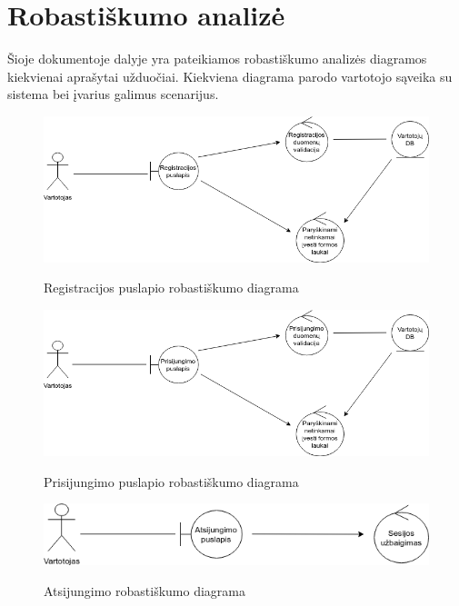 \documentclass{VUMIFPSkursinis}
\begin{document}
	\newpage

	\section{Robastiškumo analizė}
	Šioje dokumentoje dalyje yra pateikiamos robastiškumo analizės diagramos kiekvienai aprašytai užduočiai. Kiekviena diagrama parodo vartotojo sąveika su sistema  bei įvarius galimus scenarijus.

		\begin{figure}[H]
		\centering
		\includegraphics[width=\linewidth]{img/registracija.png}
		\label{fig:registracija}
		\caption{Registracijos puslapio robastiškumo diagrama}
	\end{figure}

		\begin{figure}[H]
		\centering
		\includegraphics[width=\linewidth]{img/prisijungimas.png}
		\label{fig:prisijungimas}
		\caption{Prisijungimo puslapio robastiškumo diagrama}
	\end{figure}

		\begin{figure}[H]
		\centering
		\includegraphics[width=\linewidth]{img/atsijungimas.png}
		\label{fig:atsijungti}
		\caption{Atsijungimo robastiškumo diagrama}
	\end{figure}
\end{document}

